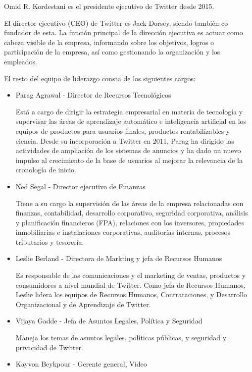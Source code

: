 Omid R. Kordestani es el presidente ejecutivo de Twitter desde 2015.

El director ejecutivo (CEO) de Twitter es Jack Dorsey, siendo también co-fundador de esta. 
La función principal de la dirección ejecutiva es actuar como cabeza visible de la empresa, informando sobre los objetivos, logros o participación de la empresa, así como gestionando la organización y los empleados.

El resto del equipo de liderazgo consta de los siguientes cargos:

\begin{itemize}

\item Parag Agrawal - Director de Recursos Tecnológicos

Está a cargo de dirigir la estrategia empresarial en materia de tecnología y supervisar las áreas de aprendizaje automático e inteligencia artificial en los equipos de productos para usuarios finales, productos rentabilizables y ciencia. Desde su incorporación a Twitter en 2011, Parag ha dirigido las actividades de ampliación de los sistemas de anuncios y ha dado un nuevo impulso al crecimiento de la base de usuarios al mejorar la relevancia de la cronología de inicio.  

\item Ned Segal - Director ejecutivo de Finanzas

Tiene a su cargo la supervisión de las áreas de la empresa relacionadas con finanzas, contabilidad, desarrollo corporativo, seguridad corporativa, análisis y planificación financieros (FPA), relaciones con los inversores, propiedades inmobiliarias e instalaciones corporativas, auditorías internas, procesos tributarios y tesorería.

\item Leslie Berland - Directora de Markting y jefa de Recursos Humanos

Es responsable de las comunicaciones y el marketing de ventas, productos y consumidores a nivel mundial de Twitter. Como jefa de Recursos Humanos, Leslie lidera los equipos de Recursos Humanos, Contrataciones, y Desarrollo Organizacional y de Aprendizaje de Twitter.

\item Vijaya Gadde - Jefa de Asuntos Legales, Política y Seguridad

Maneja los temas de asuntos legales, políticas públicas, y seguridad y privacidad de Twitter.

\item Kayvon Beykpour - Gerente general, Vídeo


\end{itemize}

